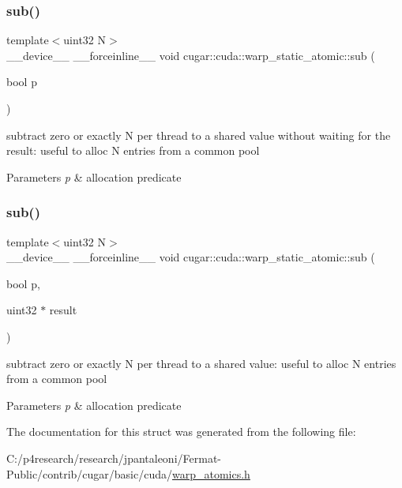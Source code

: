 \subsubsection{\texorpdfstring{sub()}{sub()}\hspace{0.1cm}{\footnotesize\ttfamily [1/2]}}
{\footnotesize\ttfamily template$<$uint32 N$>$ \\
\+\_\+\+\_\+device\+\_\+\+\_\+ \+\_\+\+\_\+forceinline\+\_\+\+\_\+ void cugar\+::cuda\+::warp\+\_\+static\+\_\+atomic\+::sub (\begin{DoxyParamCaption}\item[{bool}]{p }\end{DoxyParamCaption})\hspace{0.3cm}{\ttfamily [inline]}}

subtract zero or exactly N per thread to a shared value without waiting for the result\+: useful to alloc N entries from a common pool


\begin{DoxyParams}{Parameters}
{\em p} & allocation predicate \\
\hline
\end{DoxyParams}
\mbox{\label{structcugar_1_1cuda_1_1warp__static__atomic_a1e90e3667c88ca0de2e7ca854d9c79d2}} 
\subsubsection{\texorpdfstring{sub()}{sub()}\hspace{0.1cm}{\footnotesize\ttfamily [2/2]}}
{\footnotesize\ttfamily template$<$uint32 N$>$ \\
\+\_\+\+\_\+device\+\_\+\+\_\+ \+\_\+\+\_\+forceinline\+\_\+\+\_\+ void cugar\+::cuda\+::warp\+\_\+static\+\_\+atomic\+::sub (\begin{DoxyParamCaption}\item[{bool}]{p,  }\item[{uint32 $\ast$}]{result }\end{DoxyParamCaption})\hspace{0.3cm}{\ttfamily [inline]}}

subtract zero or exactly N per thread to a shared value\+: useful to alloc N entries from a common pool


\begin{DoxyParams}{Parameters}
{\em p} & allocation predicate \\
\hline
\end{DoxyParams}


The documentation for this struct was generated from the following file\+:\begin{DoxyCompactItemize}
\item 
C\+:/p4research/research/jpantaleoni/\+Fermat-\/\+Public/contrib/cugar/basic/cuda/\hyperlink{warp__atomics_8h}{warp\+\_\+atomics.\+h}\end{DoxyCompactItemize}
